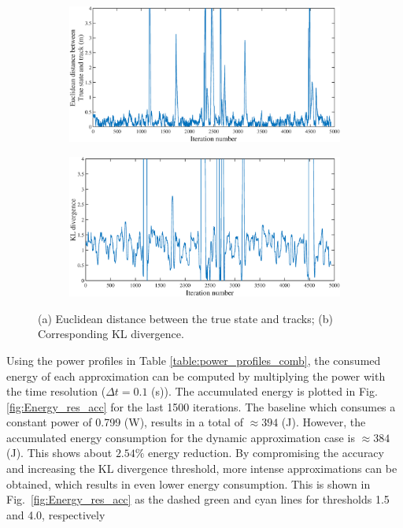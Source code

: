 \begin{figure}
    \centering
    \begin{subfigure}[tb]{0.465\textwidth}
        \includegraphics[width=\textwidth]{img/Err_figure_cropped.eps}
        \caption{}
        \label{fig:gull}
    \end{subfigure}
    \begin{subfigure}[tb]{0.45\textwidth}
        \includegraphics[width=\textwidth]{img/KL_figure_cropped.eps}
        \caption{}
        \label{fig:tiger}
    \end{subfigure}
    \caption{(a) Euclidean distance between the true state and tracks; (b) Corresponding KL divergence.}
    \label{fig:KL_and_err}
\end{figure}

Using the power profiles in Table \ref{table:power_profiles_comb}, the consumed energy of each approximation can be computed by multiplying the power with the time resolution ($\Delta t = 0.1$ (s)). The accumulated energy is plotted in Fig. \ref{fig:Energy_res_acc} for the last 1500 iterations. 
The baseline which consumes a constant power of 0.799 (W), results in a total of $\approx 394$ (J). However, the accumulated energy consumption for the dynamic approximation case is $\approx 384$ (J). This shows about $2.54 \%$ energy reduction.
By compromising the accuracy and increasing the KL divergence threshold, more intense approximations can be obtained, which results in even lower energy consumption. This is shown in Fig.~\ref{fig:Energy_res_acc} as the dashed green and cyan lines for thresholds 1.5 and 4.0, respectively

